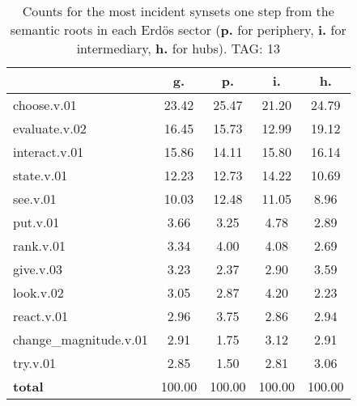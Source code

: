 \begin{table}[h!]
\begin{center}
\begin{tabular}{| l | c | c | c | c |}\hline
 & g. & p. & i. & h. \\\hline
choose.v.01 & 23.42  & 25.47  & 21.20  & 24.79 \\\hline
evaluate.v.02 & 16.45  & 15.73  & 12.99  & 19.12 \\\hline
interact.v.01 & 15.86  & 14.11  & 15.80  & 16.14 \\\hline
state.v.01 & 12.23  & 12.73  & 14.22  & 10.69 \\\hline
see.v.01 & 10.03  & 12.48  & 11.05  & 8.96 \\\hline
put.v.01 & 3.66  & 3.25  & 4.78  & 2.89 \\\hline
rank.v.01 & 3.34  & 4.00  & 4.08  & 2.69 \\\hline
give.v.03 & 3.23  & 2.37  & 2.90  & 3.59 \\\hline
look.v.02 & 3.05  & 2.87  & 4.20  & 2.23 \\\hline
react.v.01 & 2.96  & 3.75  & 2.86  & 2.94 \\\hline
change\_magnitude.v.01 & 2.91  & 1.75  & 3.12  & 2.91 \\\hline
try.v.01 & 2.85  & 1.50  & 2.81  & 3.06 \\\hline
{{\bf total}} & 100.00  & 100.00  & 100.00  & 100.00 \\\hline
\end{tabular}
\caption{Counts for the most incident synsets one step from the semantic roots in each Erd\"os sector ({\bf p.} for periphery, {\bf i.} for intermediary, {\bf h.} for hubs). TAG: 13}
\end{center}
\end{table}